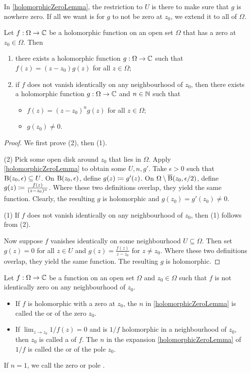 In \ref{holomorphicZeroLemma}, the restriction to $U$ is there to make sure that $g$ is nowhere zero. If all we want is for $g$ to not be zero at $z_0$, we extend it to all of $\Omega$.

\begin{lemma} \label{holomorphicZeroFactorisationLemma}
Let $f:\Omega\to \mathbb{C}$ be a holomorphic function on an open set $\Omega$ that has a zero at $z_0\in \Omega$.
Then
\begin{enumerate}
\item there exists a holomorphic function $g: \Omega \to \mathbb{C}$ such that $f(z) = (z-z_0)g(z)$ for all $z\in \Omega$;
\item if $f$ does not vanish identically on any neighbourhood of $z_0$, then there exists a holomorphic function $g: \Omega \to \mathbb{C}$ and $n\in \mathbb{N}$ such that
\begin{itemize}
\item $f(z) = (z-z_0)^ng(z)$ for all $z\in \Omega$;
\item $g(z_0) \neq 0$.
\end{itemize}
\end{enumerate}
\end{lemma}
\begin{proof}
We first prove (2), then (1).

(2) Pick some open disk around $z_0$ that lies in $\Omega$. Apply \ref{holomorphicZeroLemma} to obtain some $U,n,g'$. Take $\epsilon >0$ such that $\operatorname{B}(z_0, \epsilon) \subseteq U$. On $\operatorname{B}(z_0, \epsilon)$, define $g(z) \coloneqq g'(z)$. On $\Omega\setminus\operatorname{\overline{B}}(z_0, \epsilon /2)$, define $g(z) \coloneqq \frac{f(z)}{(z-z_0)^n}$. Where these two definitions overlap, they yield the same function. Clearly, the resulting $g$ is holomorphic and $g(z_0) = g'(z_0) \neq 0$.

(1) If $f$ does not vanish identically on any neighbourhood of $z_0$, then (1) follows from (2).

Now suppose $f$ vanishes identically on some neighbourhood $U\subseteq \Omega$. Then set $g(z) = 0$ for all $z\in U$ and $g(z) = \frac{f(z)}{z-z_0}$ for $z\neq z_0$. Where these two definitions overlap, they yield the same function. The resulting $g$ is holomorphic.
\end{proof}

\begin{definition}
Let $f:\Omega\to \mathbb{C}$ be a function on an open set $\Omega$ and $z_0\in \Omega$ such that $f$ is not identically zero on any neighbourhood of $z_0$.
\begin{itemize}
\item If $f$ is holomorphic with a zero at $z_0$, the $n$ in \ref{holomorphicZeroLemma} is called the  or  of the zero $z_0$.
\item If $\lim_{z\to z_0} 1/f(z) = 0$ and is $1/f$ holomorphic in a neighbourhood of $z_0$, then $z_0$ is called a  of $f$. The $n$ in the expansion \ref{holomorphicZeroLemma} of $1/f$ is called the  or  of the pole $z_0$.
\end{itemize}
If $n = 1$, we call the zero or pole . 
\end{definition}

